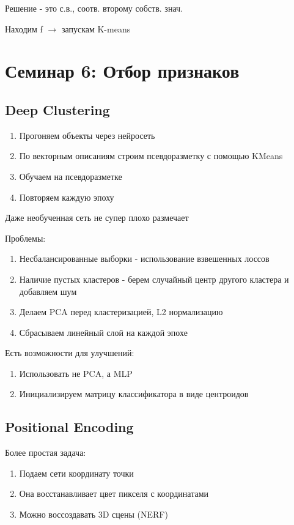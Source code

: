\documentclass[a4paper, 12pt]{article}
\begin{document}
Решение - это с.в., соотв. второму собств. знач.

Находим f $\rightarrow$ запускам K-means

\section{Семинар 6: Отбор признаков}

\subsection{Deep Clustering}

\begin{enumerate}
    \item Прогоняем объекты через нейросеть
    \item По векторным описаниям строим псевдоразметку
    с помощью KMeans
    \item Обучаем на псевдоразметке
    \item Повторяем каждую эпоху
\end{enumerate}

Даже необученная сеть не супер плохо размечает

Проблемы:

\begin{enumerate}
    \item Несбалансированные выборки - использование 
    взвешенных лоссов
    \item Наличие пустых кластеров - берем случайный центр 
    другого кластера и добавляем шум
    \item Делаем PCA перед кластеризацией, L2 нормализацию
    \item Сбрасываем линейный слой на каждой эпохе
\end{enumerate}

Есть возможности для улучшений:

\begin{enumerate}
    \item Использовать не PCA, а MLP
    \item Инициализируем матрицу классификатора в виде центроидов
\end{enumerate}

\subsection{Positional Encoding}

Более простая задача:

\begin{enumerate}
    \item Подаем сети координату точки
    \item Она восстанавливает цвет пикселя с координатами
    \item Можно воссоздавать 3D сцены (NERF)
\end{enumerate}
\end{document}

